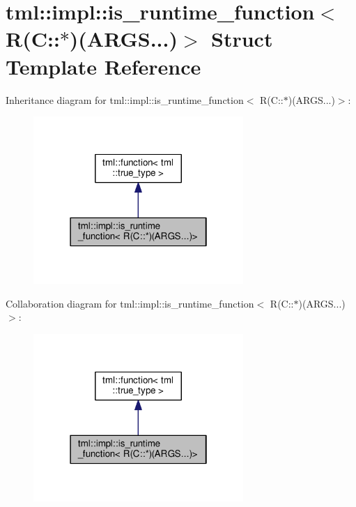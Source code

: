 \hypertarget{structtml_1_1impl_1_1is__runtime__function_3_01_r_07_c_1_1_5_08_07_a_r_g_s_8_8_8_08_4}{\section{tml\+:\+:impl\+:\+:is\+\_\+runtime\+\_\+function$<$ R(C\+:\+:$\ast$)(A\+R\+G\+S...)$>$ Struct Template Reference}
\label{structtml_1_1impl_1_1is__runtime__function_3_01_r_07_c_1_1_5_08_07_a_r_g_s_8_8_8_08_4}
}


Inheritance diagram for tml\+:\+:impl\+:\+:is\+\_\+runtime\+\_\+function$<$ R(C\+:\+:$\ast$)(A\+R\+G\+S...)$>$\+:
\nopagebreak
\begin{figure}[H]
\begin{center}
\leavevmode
\includegraphics[width=226pt]{structtml_1_1impl_1_1is__runtime__function_3_01_r_07_c_1_1_5_08_07_a_r_g_s_8_8_8_08_4__inherit__graph}
\end{center}
\end{figure}


Collaboration diagram for tml\+:\+:impl\+:\+:is\+\_\+runtime\+\_\+function$<$ R(C\+:\+:$\ast$)(A\+R\+G\+S...)$>$\+:
\nopagebreak
\begin{figure}[H]
\begin{center}
\leavevmode
\includegraphics[width=226pt]{structtml_1_1impl_1_1is__runtime__function_3_01_r_07_c_1_1_5_08_07_a_r_g_s_8_8_8_08_4__coll__graph}
\end{center}
\end{figure}
